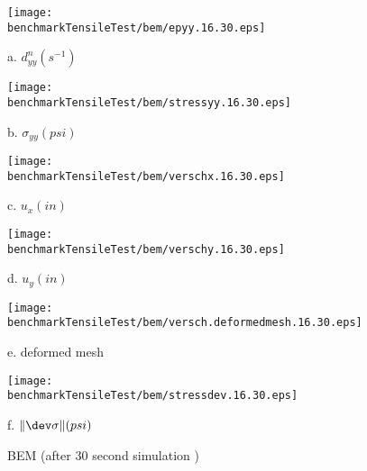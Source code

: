 \clearpage
\begin{figure}[h!]
\begin{minipage}[l]{7cm}
 \texttt{[image: \\benchmarkTensileTest/bem/epyy.16.30.eps]}

a. $d^n_{yy}(s^{-1})$
\end{minipage}
\begin{minipage}[l]{7cm}  
 \texttt{[image: \\benchmarkTensileTest/bem/stressyy.16.30.eps]}

b. $\sigma_{yy}(psi)$
\end{minipage}
\begin{minipage}[l]{7cm}  
 \texttt{[image: \\benchmarkTensileTest/bem/verschx.16.30.eps]}

c. $u_x(in)$
\end{minipage}
\begin{minipage}[l]{7cm}  
 \texttt{[image: \\benchmarkTensileTest/bem/verschy.16.30.eps]}

d. $u_y(in)$
\end{minipage}
\begin{minipage}[l]{8.5cm}  
 \texttt{[image: \\benchmarkTensileTest/bem/versch.deformedmesh.16.30.eps]}

e. deformed mesh
\end{minipage}
\begin{minipage}[l]{7cm}  
 \texttt{[image: \\benchmarkTensileTest/bem/stressdev.16.30.eps]}

f. $\|\dev \sigma\|(psi)$
\end{minipage}
\caption{BEM (after 30 second simulation )}\label{fig:Hart:BEM}
\end{figure} 

